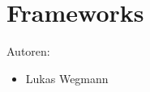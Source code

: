 \chapter{Frameworks}
\label{sec:frameworks}

Autoren:
\begin{itemize}
	\item Lukas Wegmann
\end{itemize}

